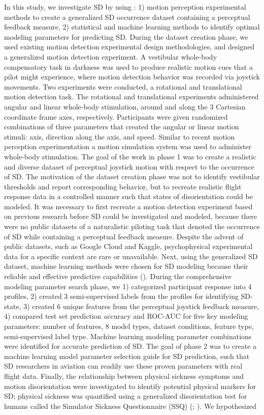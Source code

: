 \documentclass[11pt, onecolumn]{article}
\begin{document}
In this study, we investigate SD by using : 1) motion perception experimental methods to create a generalized SD occurrence dataset containing a perceptual feedback measure, 2) statistical and machine learning methods to identify optimal modeling parameters for predicting SD.  During the dataset creation phase, we used existing motion detection experimental design methodologies, and designed a generalized motion detection experiment.  A vestibular whole-body compensatory task in darkness was used to produce realistic motion cues that a pilot might experience, where motion detection behavior was recorded via joystick movements.  Two experiments were conducted, a rotational and translational motion detection task.  The rotational and translational experiments administered angular and linear whole-body stimulation, around and along the 3 Cartesian coordinate frame axes, respectively.  Participants were given randomized combinations of three parameters that created the angular or linear motion stimuli: axis, direction along the axis, and speed.  Similar to recent motion perception experimentation a motion simulation system was used to administer whole-body stimulation.  The goal of the work in phase 1 was to create a realistic and diverse dataset of perceptual joystick motion with respect to the occurrence of SD.  The motivation of the dataset creation phase was not to identify vestibular thresholds and report corresponding behavior, but to recreate realistic flight response data in a controlled manner such that states of disorientation could be modeled.  It was necessary to first recreate a motion detection experiment based on previous research before SD could be investigated and modeled, because there were no public datasets of a naturalistic piloting task that denoted the occurrence of SD while containing a perceptual feedback measure.  Despite the advent of public datasets, such as Google Cloud and Kaggle, psychophysical experimental data for a specific context are rare or unavailable.  Next, using the generalized SD dataset, machine learning methods were chosen for SD modeling because their reliable and effective predictive capabilities (\cite{Burkov_2019_ML}).  During the comprehensive modeling parameter search phase, we 1) categorized participant response into 4 profiles, 2) created 3 semi-supervised labels from the profiles for identifying SD-state, 3) created 6 unique features from the perceptual joystick feedback measure, 4) compared test set prediction accuracy and ROC-AUC for five key modeling parameters: number of features, 8 model types, dataset conditions, feature type, semi-supervised label type.  Machine learning modeling parameter combinations were identified for accurate prediction of SD.  The goal of phase 2 was to create a machine learning model parameter selection guide for SD prediction, such that SD researchers in aviation can readily use these proven parameters with real flight data.  Finally, the relationship between physical sickness symptoms and motion disorientation were investigated to identify potential physical markers for SD; physical sickness was quantified using a generalized disorientation test for humans called the Simulator Sickness Questionnaire (SSQ) (\cite{Kennedy_1993_Simulator}; \cite{Bouchard_2007_SimulatorSickness}).  We hypothesized 
\end{document}
